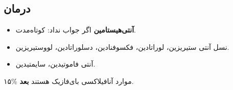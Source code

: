 \documentclass[12pt,a4paper]{article}
\begin{document}
\subsection*{درمان}
\begin{itemize}
  \item \textbf{آنتی‌هیستامین} \ANarrow{} اگر جواب نداد:
  \textbf{} کوتاه‌مدت.
  \item نسل  آنتی  \ANarrow{}
  ستیریزین، لوراتادین، فکسوفنادین، دسلوراتادین، لووستیریزین.
  \item آنتی  \ANarrow{} فاموتیدین، سایمتیدین.
\end{itemize}

\clearpage
{}

۱۵\% موارد آنافیلاکسی \ANarrow{} بای‌فازیک هستند
\ANarrow{} \textbf{ بعد}.

\endgroup
\ANfinish
\end{document}
